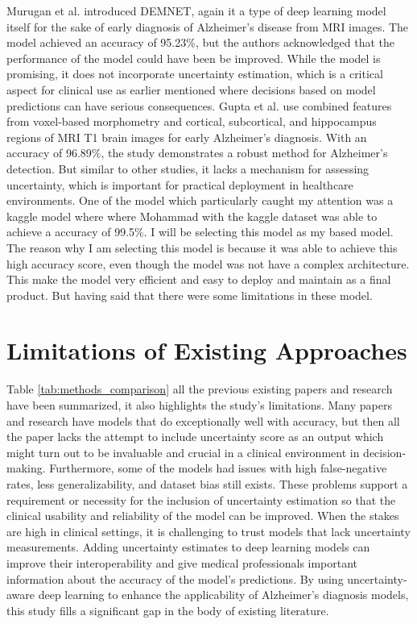 \documentclass[12pt,onecolumn]{report}
\begin{document}
Murugan et al. \cite{Murugan2021} introduced DEMNET, again it a type of deep learning model itself for the sake of early diagnosis of Alzheimer’s disease from MRI images. The model achieved an accuracy of 95.23\%, but the authors acknowledged that the performance of the model could have been be improved. While the model is promising, it does not incorporate uncertainty estimation, which is a critical aspect for clinical use as earlier mentioned where decisions based on model predictions can have serious consequences. Gupta et al. \cite{Gupta2019} use combined features from voxel-based morphometry and cortical, subcortical, and hippocampus regions of MRI T1 brain images for early Alzheimer’s diagnosis. With an accuracy of 96.89\%, the study demonstrates a robust method for Alzheimer’s detection. But similar to other studies, it lacks a mechanism for assessing uncertainty, which is important for practical deployment in healthcare environments. One of the model which particularly caught my attention was a kaggle model where where Mohammad \cite{gobara_kaggle_notebook2024} with the kaggle dataset was able to achieve a accuracy of 99.5\%. I will be selecting this model as my based model. The reason why I am selecting this model is because it was able to achieve this high accuracy score, even though the model was not have a complex architecture. This make the model very efficient and easy to deploy and maintain as a final product. But having said that there were some limitations in these model.

\section{Limitations of Existing Approaches}
Table \ref{tab:methods_comparison} all the previous existing papers and research have been summarized, it also highlights the study's limitations. Many papers and research have models that do exceptionally well with accuracy, but then all the paper lacks the attempt to include uncertainty score as an output which might turn out to be invaluable and crucial in a clinical environment in decision-making. Furthermore, some of the models had issues with high false-negative rates, less generalizability, and dataset bias still exists. These problems support a requirement or necessity for the inclusion of uncertainty estimation so that the clinical usability and reliability of the model can be improved. When the stakes are high in clinical settings, it is challenging to trust models that lack uncertainty measurements. Adding uncertainty estimates to deep learning models can improve their interoperability and give medical professionals important information about the accuracy of the model's predictions. By using uncertainty-aware deep learning to enhance the applicability of Alzheimer's diagnosis models, this study fills a significant gap in the body of existing literature.
\end{document}
